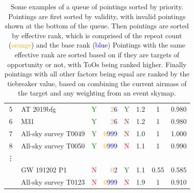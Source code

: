\begin{colsection}
\begin{colsection}
\begin{table}[t]
\begin{center}
\begin{tabular}{c|l|crc|ccc}
            5 &
            AT 2019bfg &
            \textcolor{Green}{Y} &
            \textcolor{Orange}{2}\textcolor{Blue}{6} &
            \textcolor{Green}{Y} &
            1.2 &
            1 &
            0.980 \\

            6 &
            M31 &
            \textcolor{Green}{Y} &
            \textcolor{Orange}{2}\textcolor{Blue}{6} &
            \textcolor{Red}{N} &
            1.2 &
            1 &
            0.980 \\

            7 &
            All-sky survey T0049 &
            \textcolor{Green}{Y} &
            \textcolor{Orange}{0}\textcolor{Blue}{999} &
            \textcolor{Red}{N} &
            1.0 &
            1 &
            1.000 \\

            8 &
            All-sky survey T0050 &
            \textcolor{Green}{Y} &
            \textcolor{Orange}{0}\textcolor{Blue}{999} &
            \textcolor{Red}{N} &
            1.1 &
            1 &
            0.990 \\

            \vdots & & & & & & \\

            &
            GW 191202 P1 &
            \textcolor{Red}{N} &
            \textcolor{Orange}{0}\textcolor{Blue}{2} &
            \textcolor{Green}{Y} &
            1.1 &
            0.55 &
            0.585 \\

            &
            All-sky survey T0123 &
            \textcolor{Red}{N} &
            \textcolor{Orange}{0}\textcolor{Blue}{999} &
            \textcolor{Red}{N} &
            1.9 &
            1 &
            0.910 \\

        \end{tabular}
    \end{center}
    \caption[Examples of sorting pointings by priority]{
        Some examples of a queue of pointings sorted by priority. Pointings are first sorted by validity, with invalid pointings shown at the bottom of the queue. Then pointings are sorted by effective rank, which is comprised of the repeat count (\textcolor{Orange}{orange}) and the base rank (\textcolor{Blue}{blue}) Pointings with the same effective rank are sorted based on if they are targets of opportunity or not, with ToOs being ranked higher. Finally pointings with all other factors being equal are ranked by the tiebreaker value, based on combining the current airmass of the target and any weighting from an event skymap.
    }\label{tab:priority}
\end{table}


\end{colsection}
\end{colsection}
